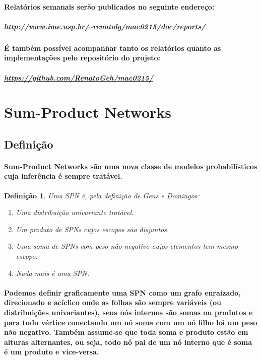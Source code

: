 \documentclass[a4paper,10pt]{article}
\theoremstyle{plain}
\newtheorem*{spn-def}{Definição}
\begin{document}
\paragraph{
  Relatórios semanais serão publicados no seguinte endereço: 
}

\subparagraph{\url{http://www.ime.usp.br/~renatolg/mac0215/doc/reports/}}

\paragraph{
  É também possível acompanhar tanto os relatórios quanto as implementações pelo repositório
do projeto:
}

\subparagraph{\url{https://github.com/RenatoGeh/mac0215/}}

\section{Sum-Product Networks}
\subsection{Definição}

\paragraph{
  Sum-Product Networks são uma nova classe de modelos probabilísticos cuja inferência é sempre
tratável.
}

\begin{spn-def} Uma SPN é, pela definição de Gens e Domingos\cite{gens-domingos}:

\begin{enumerate} \itemsep0pt
  \item Uma distribuição univariante tratável.
  \item Um produto de SPNs cujos escopos são disjuntos.
  \item Uma soma de SPNs com peso não negativo cujos elementos tem mesmo escopo.
  \item Nada mais é uma SPN.
\end{enumerate}
\end{spn-def}

\paragraph{
  Podemos definir graficamente uma SPN como um grafo enraizado, direcionado e acíclico onde as 
folhas são sempre variáveis (ou distribuições univariantes), seus nós internos são somas ou 
produtos e para todo vértice conectando um nó soma com um nó filho há um peso não negativo. 
Também assume-se que toda soma e produto estão em alturas alternantes, ou seja, todo nó pai 
de um nó interno que é soma é um produto e vice-versa.
}
\end{document}
